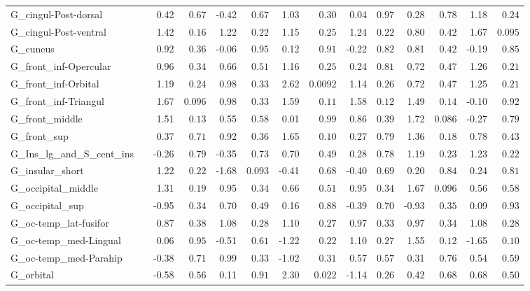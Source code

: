 {\begin{longtable}{llrrrrrrrrrrrr}
G\_cingul-Post-dorsal &  & 0.42 & $0.67$ & -0.42 & $0.67$ & 1.03 & $0.30$ & 0.04 & $0.97$ & 0.28 & $0.78$ & 1.18 & $0.24$ \\
G\_cingul-Post-ventral &  & 1.42 & $0.16$ & 1.22 & $0.22$ & 1.15 & $0.25$ & 1.24 & $0.22$ & 0.80 & $0.42$ & 1.67 & $0.095$ \\
G\_cuneus &  & 0.92 & $0.36$ & -0.06 & $0.95$ & 0.12 & $0.91$ & -0.22 & $0.82$ & 0.81 & $0.42$ & -0.19 & $0.85$ \\
G\_front\_inf-Opercular &  & 0.96 & $0.34$ & 0.66 & $0.51$ & 1.16 & $0.25$ & 0.24 & $0.81$ & 0.72 & $0.47$ & 1.26 & $0.21$ \\
G\_front\_inf-Orbital &  & 1.19 & $0.24$ & 0.98 & $0.33$ & 2.62 & $0.0092$ & 1.14 & $0.26$ & 0.72 & $0.47$ & 1.25 & $0.21$ \\
G\_front\_inf-Triangul &  & 1.67 & $0.096$ & 0.98 & $0.33$ & 1.59 & $0.11$ & 1.58 & $0.12$ & 1.49 & $0.14$ & -0.10 & $0.92$ \\
G\_front\_middle &  & 1.51 & $0.13$ & 0.55 & $0.58$ & 0.01 & $0.99$ & 0.86 & $0.39$ & 1.72 & $0.086$ & -0.27 & $0.79$ \\
G\_front\_sup &  & 0.37 & $0.71$ & 0.92 & $0.36$ & 1.65 & $0.10$ & 0.27 & $0.79$ & 1.36 & $0.18$ & 0.78 & $0.43$ \\
G\_Ins\_lg\_and\_S\_cent\_ins &  & -0.26 & $0.79$ & -0.35 & $0.73$ & 0.70 & $0.49$ & 0.28 & $0.78$ & 1.19 & $0.23$ & 1.23 & $0.22$ \\
G\_insular\_short &  & 1.22 & $0.22$ & -1.68 & $0.093$ & -0.41 & $0.68$ & -0.40 & $0.69$ & 0.20 & $0.84$ & 0.24 & $0.81$ \\
G\_occipital\_middle &  & 1.31 & $0.19$ & 0.95 & $0.34$ & 0.66 & $0.51$ & 0.95 & $0.34$ & 1.67 & $0.096$ & 0.56 & $0.58$ \\
G\_occipital\_sup &  & -0.95 & $0.34$ & 0.70 & $0.49$ & 0.16 & $0.88$ & -0.39 & $0.70$ & -0.93 & $0.35$ & 0.09 & $0.93$ \\
G\_oc-temp\_lat-fusifor &  & 0.87 & $0.38$ & 1.08 & $0.28$ & 1.10 & $0.27$ & 0.97 & $0.33$ & 0.97 & $0.34$ & 1.08 & $0.28$ \\
G\_oc-temp\_med-Lingual &  & 0.06 & $0.95$ & -0.51 & $0.61$ & -1.22 & $0.22$ & 1.10 & $0.27$ & 1.55 & $0.12$ & -1.65 & $0.10$ \\
G\_oc-temp\_med-Parahip &  & -0.38 & $0.71$ & 0.99 & $0.33$ & -1.02 & $0.31$ & 0.57 & $0.57$ & 0.31 & $0.76$ & 0.54 & $0.59$ \\
G\_orbital &  & -0.58 & $0.56$ & 0.11 & $0.91$ & 2.30 & $0.022$ & -1.14 & $0.26$ & 0.42 & $0.68$ & 0.68 & $0.50$ \\

\end{longtable}}
